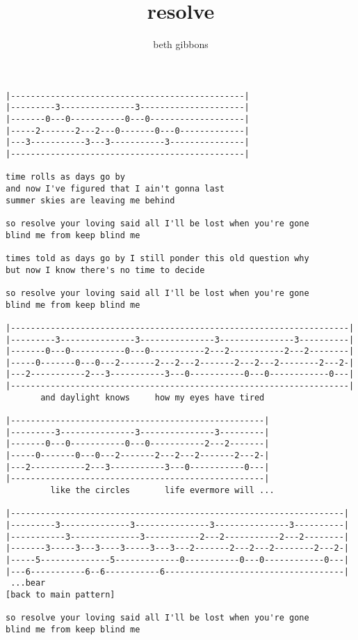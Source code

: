 \author{beth gibbons}
\title{resolve}
\maketitle
\begin{verbatim}
|-----------------------------------------------|
|---------3---------------3---------------------|
|-------0---0-----------0---0-------------------|
|-----2-------2---2---0-------0---0-------------|
|---3-----------3---3-----------3---------------|
|-----------------------------------------------|

time rolls as days go by
and now I've figured that I ain't gonna last
summer skies are leaving me behind

so resolve your loving said all I'll be lost when you're gone
blind me from keep blind me

times told as days go by I still ponder this old question why
but now I know there's no time to decide

so resolve your loving said all I'll be lost when you're gone
blind me from keep blind me

|--------------------------------------------------------------------|
|---------3---------------3---------------3---------------3----------|
|-------0---0-----------0---0-----------2---2-----------2---2--------|
|-----0-------0---0---2-------2---2---2-------2---2---2--------2---2-|
|---2-----------2---3-----------3---0-----------0---0------------0---|
|--------------------------------------------------------------------|
       and daylight knows     how my eyes have tired

|---------------------------------------------------|
|---------3---------------3---------------3---------|
|-------0---0-----------0---0-----------2---2-------|
|-----0-------0---0---2-------2---2---2-------2---2-|
|---2-----------2---3-----------3---0-----------0---|
|---------------------------------------------------|
         like the circles       life evermore will ...

|-------------------------------------------------------------------|
|---------3--------------3---------------3---------------3----------|
|-----------3--------------3-----------2---2-----------2---2--------|
|-------3-----3---3----3-----3---3---2-------2---2---2--------2---2-|
|-----5--------------5-------------0-----------0---0------------0---|
|---6-----------6--6-----------6------------------------------------|
 ...bear
[back to main pattern]

so resolve your loving said all I'll be lost when you're gone
blind me from keep blind me
\end{verbatim}